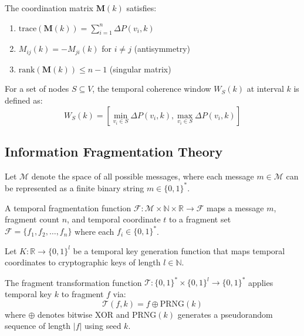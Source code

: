 \begin{lemma}
The coordination matrix $\mathbf{M}(k)$ satisfies:
\begin{enumerate}
\item $\text{trace}(\mathbf{M}(k)) = \sum_{i=1}^n \Delta P(v_i, k)$
\item $M_{ij}(k) = -M_{ji}(k)$ for $i \neq j$ (antisymmetry)
\item $\text{rank}(\mathbf{M}(k)) \leq n-1$ (singular matrix)
\end{enumerate}
\end{lemma}

\begin{definition}
For a set of nodes $S \subseteq V$, the temporal coherence window $W_S(k)$ at interval $k$ is defined as:
\begin{equation}
W_S(k) = \left[ \min_{v_i \in S} \Delta P(v_i, k), \max_{v_i \in S} \Delta P(v_i, k) \right]
\end{equation}
\end{definition}

\subsection{Information Fragmentation Theory}

\begin{definition}
Let $\mathcal{M}$ denote the space of all possible messages, where each message $m \in \mathcal{M}$ can be represented as a finite binary string $m \in \{0,1\}^*$.
\end{definition}

\begin{definition}
A temporal fragmentation function $\mathcal{F}: \mathcal{M} \times \mathbb{N} \times \mathbb{R} \to \mathcal{F}$ maps a message $m$, fragment count $n$, and temporal coordinate $t$ to a fragment set $\mathcal{F} = \{f_1, f_2, \ldots, f_n\}$ where each $f_i \in \{0,1\}^*$.
\end{definition}

\begin{definition}
Let $K: \mathbb{R} \to \{0,1\}^l$ be a temporal key generation function that maps temporal coordinates to cryptographic keys of length $l \in \mathbb{N}$.
\end{definition}

\begin{definition}
The fragment transformation function $\mathcal{T}: \{0,1\}^* \times \{0,1\}^l \to \{0,1\}^*$ applies temporal key $k$ to fragment $f$ via:
\begin{equation}
\mathcal{T}(f, k) = f \oplus \text{PRNG}(k)
\end{equation}
where $\oplus$ denotes bitwise XOR and $\text{PRNG}(k)$ generates a pseudorandom sequence of length $|f|$ using seed $k$.
\end{definition}

